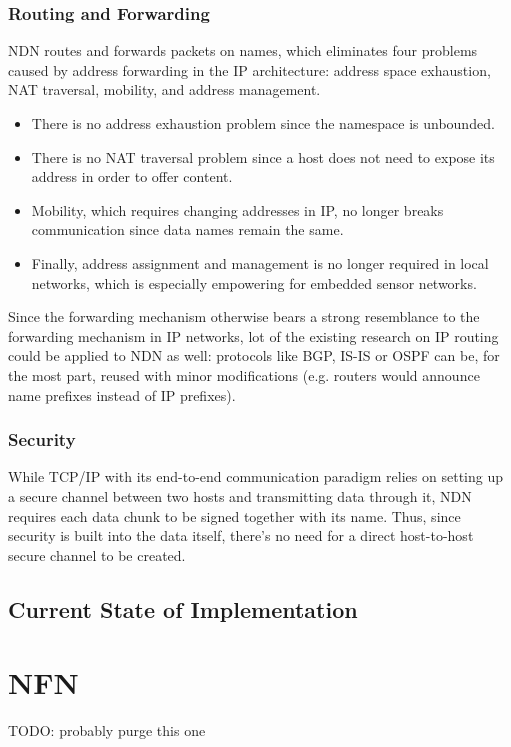             \subsubsection{Routing and Forwarding}
                NDN routes and forwards packets on names, which eliminates four problems caused by address forwarding in the IP architecture: address space exhaustion, NAT traversal, mobility, and address management.
                \begin{itemize}
                    \item There is no address exhaustion problem since the namespace is unbounded.
                    \item There is no NAT traversal problem since a host does not need to expose its address in order to offer content.
                    \item Mobility, which requires changing addresses in IP, no longer breaks communication since data names remain the same.
                    \item Finally, address assignment and management is no longer required in local networks, which is especially empowering for embedded sensor networks.
                \end{itemize}

                Since the forwarding mechanism otherwise bears a strong resemblance to the forwarding mechanism in IP networks, lot of the existing research on IP routing could be applied to NDN as well: protocols like BGP, IS-IS or OSPF can be, for the most part, reused with minor modifications (e.g. routers would announce name prefixes instead of IP prefixes).

            \subsubsection{Security}
                While TCP/IP with its end-to-end communication paradigm relies on setting up a secure channel between two hosts and transmitting data through it, NDN requires each data chunk to be signed together with its name. Thus, since security is built into the data itself, there's no need for a direct host-to-host secure channel to be created.

        \subsection{Current State of Implementation}

    \section{NFN}
        TODO: probably purge this one

